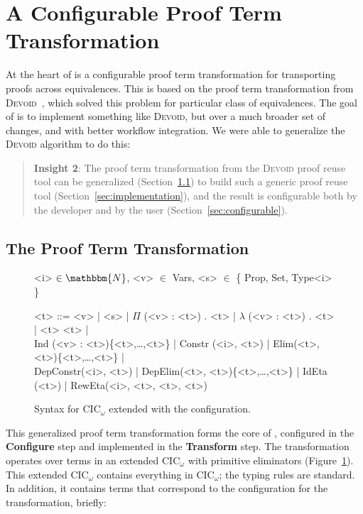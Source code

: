\section{A Configurable Proof Term Transformation}
\label{sec:key2}

At the heart of \toolname is a configurable proof term transformation for transporting
proofs across equivalences. This is based on the proof term transformation from 
\textsc{Devoid}~\cite{Ringer2019}, which solved this problem for particular class of equivalences.
The goal of \toolname is to implement something like \textsc{Devoid}, but over
a much broader set of changes, and with better workflow integration.
We were able to generalize the \textsc{Devoid} algorithm to do this:

\begin{quote}
\textbf{Insight 2}:
The proof term transformation from the \textsc{Devoid} proof reuse tool can be generalized (Section~\ref{sec:generic})
to build such a generic proof reuse tool (Section~\ref{sec:implementation}),
and the result is configurable both by the developer and by the user (Section~\ref{sec:configurable}).
\end{quote}

\subsection{The Proof Term Transformation}
\label{sec:generic}

\begin{figure}
\small
\begin{grammar}
<i> $\in \mathbbm{N}$, <v> $\in$ Vars, <s> $\in$ \{ Prop, Set, Type<i> \}

<t> ::= <v> | <s> | $\Pi$ (<v> : <t>) . <t> | $\lambda$ (<v> : <t>) . <t> | <t> <t> | \\
Ind (<v> : <t>)\{<t>,\ldots,<t>\} | Constr (<i>, <t>) | Elim(<t>, <t>)\{<t>,\ldots,<t>\} | \\
DepConstr(<i>, <t>) | DepElim(<t>, <t>)\{<t>,\ldots,<t>\} | IdEta (<t>) | RewEta(<i>, <t>, <t>, <t>)
\end{grammar}
\caption{Syntax for CIC$_\omega$ extended with the \toolname configuration.}
\label{fig:syntax}
\end{figure}

This generalized proof term transformation forms the core of \toolname, configured in the \textbf{Configure}
step and implemented in the \textbf{Transform} step.
The transformation operates over terms in an extended CIC$_{\omega}$ with primitive eliminators (Figure~\ref{fig:syntax}).
This extended CIC$_{\omega}$ contains everything in CIC$_{\omega}$; the typing rules are standard.
In addition, it contains terms that correspond to the configuration for the transformation, briefly:


